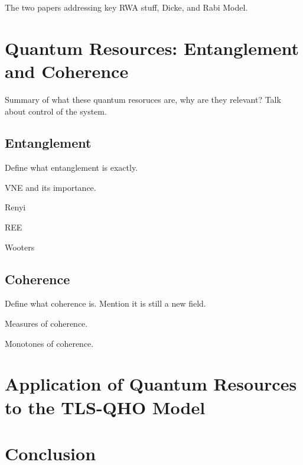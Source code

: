 \documentclass[12pt,a4paper]{article}
\begin{document}
The two papers addressing key RWA stuff, Dicke, and Rabi Model.




\newpage

\section{Quantum Resources: Entanglement and Coherence} \label{sec_QRes}

Summary of what these quantum resoruces are, why are they relevant? Talk about control of the system.

\subsection{Entanglement}

Define what entanglement is exactly. 

VNE and its importance. 

Renyi

REE

Wooters

\subsection{Coherence}

Define what coherence is. Mention it is still a new field.

Measures of coherence.

Monotones of coherence.


\newpage

\section{Application of Quantum Resources to the TLS-QHO Model} \label{sec_QRes_app}

\newpage

\section{Conclusion} \label{sec_Conclusion}


\newpage

 
 
\end{document}
